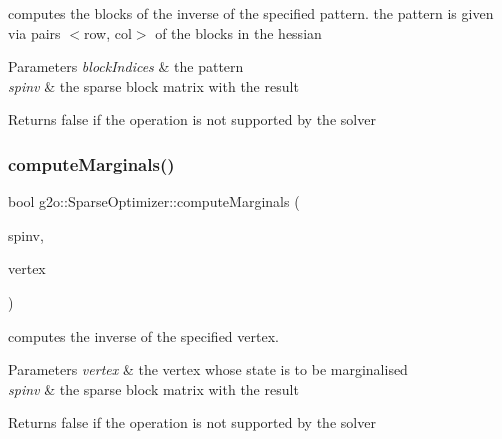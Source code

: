 computes the blocks of the inverse of the specified pattern. the pattern is given via pairs $<$row, col$>$ of the blocks in the hessian 
\begin{DoxyParams}{Parameters}
{\em block\+Indices} & the pattern \\
\hline
{\em spinv} & the sparse block matrix with the result \\
\hline
\end{DoxyParams}
\begin{DoxyReturn}{Returns}
false if the operation is not supported by the solver 
\end{DoxyReturn}
\mbox{\label{classg2o_1_1_sparse_optimizer_ad9f7ba03f7f37114f757f34f67dd48e5}} 
\subsubsection{\texorpdfstring{compute\+Marginals()}{computeMarginals()}\hspace{0.1cm}{\footnotesize\ttfamily [2/3]}}
{\footnotesize\ttfamily bool g2o\+::\+Sparse\+Optimizer\+::compute\+Marginals (\begin{DoxyParamCaption}\item[{\mbox{\hyperlink{classg2o_1_1_sparse_block_matrix}{Sparse\+Block\+Matrix}}$<$ Matrix\+Xd $>$ \&}]{spinv,  }\item[{const \mbox{\hyperlink{classg2o_1_1_hyper_graph_1_1_vertex}{Vertex}} $\ast$}]{vertex }\end{DoxyParamCaption})\hspace{0.3cm}{\ttfamily [inline]}}

computes the inverse of the specified vertex. 
\begin{DoxyParams}{Parameters}
{\em vertex} & the vertex whose state is to be marginalised \\
\hline
{\em spinv} & the sparse block matrix with the result \\
\hline
\end{DoxyParams}
\begin{DoxyReturn}{Returns}
false if the operation is not supported by the solver 
\end{DoxyReturn}
\mbox{\label{classg2o_1_1_sparse_optimizer_a06bd3e9f1576dafeae317d2697c6f532}} 
